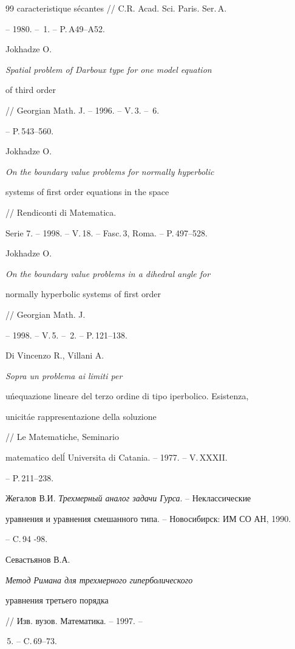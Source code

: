 \begin{thebibliography}{99}
{caracteristique s\'ecantes} // C.R. Acad. Sci. Paris. Ser.\,A.


-- 1980. -- \No\,1. -- P.\,A49--A52.




Jokhadze O. {\em Spatial problem of Darboux type for one model equation


of third order} // Georgian Math. J. -- 1996. -- V.\,3. -- \No\,6.


-- P.\,543--560.




Jokhadze O. {\em On the boundary value problems for normally hyperbolic


systems of first order equations in the space} // Rendiconti di Matematica.


Serie 7. -- 1998. -- V.\,18. -- Fasc.\,3, Roma. -- P.\,497--528.




Jokhadze O. {\em On the boundary value problems in a dihedral angle for


normally hyperbolic systems of first order} // Georgian Math. J.


-- 1998. -- V.\,5. -- \No\,2. -- P.\,121--138.




Di Vincenzo R., Villani A. {\em Sopra un problema ai limiti per


u\'{n}equazione lineare del terzo ordine di tipo iperbolico. Esistenza,


unicit\'{a}e rappresentazione della soluzione} // Le Matematiche, Seminario


matematico del\'{l}  Universita di Catania. -- 1977. -- V.\,XXXII.


-- P.\,211--238.




Жегалов В.И. {\em Трехмерный аналог задачи Гурса}. -- Неклассические


уравнения и уравнения смешанного типа. -- Новосибирск: ИМ СО АН, 1990.


-- C.\,94 -98.




Севастьянов В.А. {\em Метод Римана для трехмерного гиперболического


уравнения третьего порядка} // Изв. вузов. Математика. -- 1997. --


\No\,5. -- C.\,69--73.





\end{thebibliography}





\vskip 2cm












\label{end}





